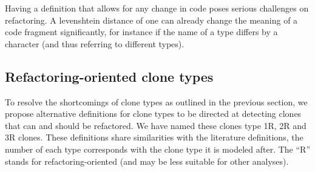 \documentclass[a4paper]{article}
\begin{document}
Having a definition that allows for any change in code poses serious challenges on refactoring. A levenshtein distance of one can already change the meaning of a code fragment significantly, for instance if the name of a type differs by a character (and thus referring to different types).

\subsection{Refactoring-oriented clone types}
To resolve the shortcomings of clone types as outlined in the previous section, we propose alternative definitions for clone types to be directed at detecting clones that can and should be refactored. We have named these clones type 1R, 2R and 3R clones. These definitions share similarities with the literature definitions, the number of each type corresponds with the clone type it is modeled after. The ``R'' stands for refactoring-oriented (and may be less suitable for other analyses).
\end{document}
